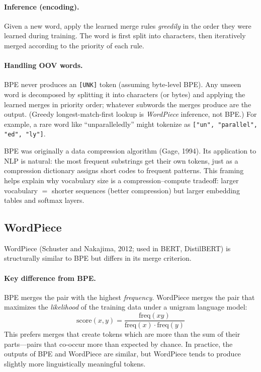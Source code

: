 \paragraph{Inference (encoding).}
Given a new word, apply the learned merge rules \emph{greedily} in the order they were
learned during training.  The word is first split into characters, then iteratively
merged according to the priority of each rule.

\paragraph{Handling OOV words.}
BPE never produces an \texttt{[UNK]} token (assuming byte-level BPE).  Any unseen word
is decomposed by splitting it into characters (or bytes) and applying the learned merges
in priority order; whatever subwords the merges produce are the output.  (Greedy
longest-match-first lookup is \emph{WordPiece} inference, not BPE.)  For example, a rare
word like ``unparalleledly'' might tokenize as \texttt{["un", "parallel", "ed", "ly"]}.

\begin{keyinsight}
BPE was originally a data compression algorithm (Gage, 1994).  Its application to NLP is
natural: the most frequent substrings get their own tokens, just as a compression
dictionary assigns short codes to frequent patterns.  This framing helps explain why
vocabulary size is a compression--compute tradeoff: larger vocabulary $=$ shorter
sequences (better compression) but larger embedding tables and softmax layers.
\end{keyinsight}

\subsection{WordPiece}
\label{sec:wordpiece}

WordPiece (Schuster and Nakajima, 2012; used in BERT, DistilBERT) is structurally
similar to BPE but differs in its merge criterion.

\paragraph{Key difference from BPE.}
BPE merges the pair with the highest \emph{frequency}.  WordPiece merges the pair that
maximizes the \emph{likelihood} of the training data under a unigram language model:
\[
    \text{score}(x, y) = \frac{\text{freq}(xy)}{\text{freq}(x) \cdot \text{freq}(y)}
\]
This prefers merges that create tokens which are more than the sum of their parts---pairs
that co-occur more than expected by chance.  In practice, the outputs of BPE and WordPiece
are similar, but WordPiece tends to produce slightly more linguistically meaningful tokens.


